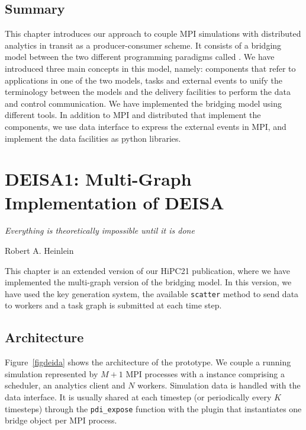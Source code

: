 \section{Summary}
This chapter introduces our approach to couple MPI simulations with \dask distributed analytics in transit as a producer-consumer scheme. 
It consists of a bridging model between the two different programming paradigms called \deisa. We have introduced three main concepts in this model, namely: components that refer to applications in one of the two models, tasks and external events to unify the terminology between the models and the delivery facilities to perform the data and control communication. 
We have implemented the bridging model using different tools. In addition to MPI and \dask distributed that implement the components, we use \pdi data interface to express the external events in MPI, and implement the data facilities as python libraries. 



\chapter{DEISA1:  Multi-Graph Implementation of DEISA} \label{deisachapter}
\vspace{20mm}

\epigraph{\textit{Everything is theoretically impossible until it is done}} {Robert A. Heinlein}
\vfill


This chapter is an extended version of our HiPC21 publication\cite{deisa}, where we have implemented the multi-graph version of the \deisa bridging model.
In this version, we have used the \dask key generation system, the available \texttt{scatter} method to send data to \dask workers and a task graph is submitted at each time step. 

\newpage

\section{Architecture}\label{sec:deisaarchi}
Figure~\ref{figdeida} shows the architecture of the \deisa prototype. We couple a running simulation represented by $M+1$ MPI processes with a \dask instance comprising a scheduler, an analytics client and $N$ workers.
Simulation data is handled with the \pdi data interface. It is usually shared at each timestep (or periodically every $K$ timesteps) through the \texttt{pdi\_expose} function with the \deisa plugin that instantiates one bridge object per MPI process. 

